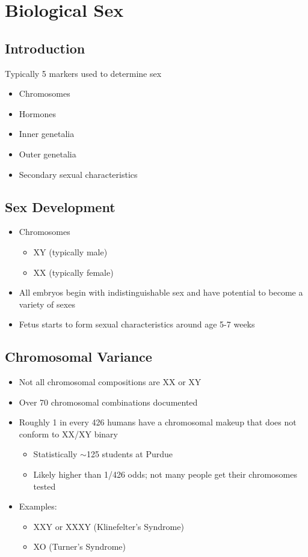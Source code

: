 \documentclass[a4paper]{article}
\begin{document}
\section{Biological Sex} %

\subsection{Introduction}
Typically 5 markers used to determine sex
\begin{itemize}
  \item Chromosomes
  \item Hormones
  \item Inner genetalia
  \item Outer genetalia
  \item Secondary sexual characteristics
\end{itemize}

\subsection{Sex Development}
\begin{itemize}
  \item Chromosomes \begin{itemize}
    \item XY (typically male)
    \item XX (typically female)
  \end{itemize}
  \item All embryos begin with indistinguishable sex and have potential to become a variety of sexes
  \item Fetus starts to form sexual characteristics around age 5-7 weeks
\end{itemize}

\subsection{Chromosomal Variance}
\begin{itemize}
  \item Not all chromosomal compositions are XX or XY
  \item Over 70 chromosomal combinations documented
  \item Roughly 1 in every 426 humans have a chromosomal makeup that does not conform to XX/XY binary \begin{itemize}
    \item Statistically $ \sim $125 students at Purdue
    \item Likely higher than 1/426 odds; not many people get their chromosomes tested
  \end{itemize}
  \item Examples: \begin{itemize}
    \item XXY or XXXY (Klinefelter's Syndrome)
    \item XO (Turner's Syndrome)
  \end{itemize}
\end{itemize}
\end{document}

